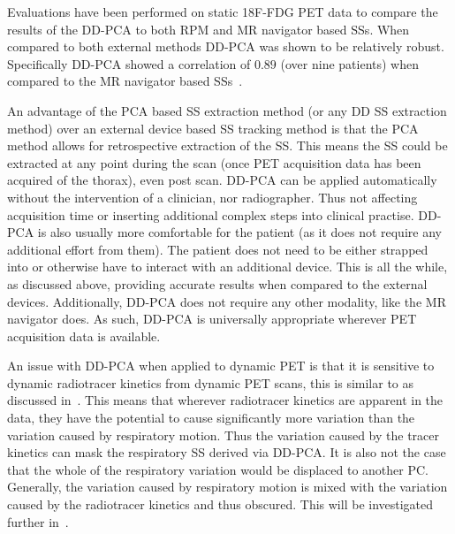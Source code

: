                 Evaluations have been performed on static \gls{18F-FDG} \gls{PET} data to compare the results of the \gls{DD-PCA} to both \gls{RPM} and \gls{MR} navigator based \glspl{SS}. When compared to both external methods \gls{DD-PCA} was shown to be relatively robust. Specifically \gls{DD-PCA} showed a correlation of $0.89$ (over nine patients) when compared to the \gls{MR} navigator based \glspl{SS}~\parencite{Thielemans2013ComparisonData, Manber2015PracticalPET/MR}.
                
                An advantage of the \gls{PCA} based \gls{SS} extraction method (or any \gls{DD} \gls{SS} extraction method) over an external device based \gls{SS} tracking method is that the \gls{PCA} method allows for retrospective extraction of the \gls{SS}. This means the \gls{SS} could be extracted at any point during the scan (once \gls{PET} acquisition data has been acquired of the thorax), even post scan. \gls{DD-PCA} can be applied automatically without the intervention of a clinician, nor radiographer. Thus not affecting acquisition time or inserting additional complex steps into clinical practise. \gls{DD-PCA} is also usually more comfortable for the patient (as it does not require any additional effort from them). The patient does not need to be either strapped into or otherwise have to interact with an additional device. This is all the while, as discussed above, providing accurate results when compared to the external devices. Additionally, \gls{DD-PCA} does not require any other modality, like the \gls{MR} navigator does. As such, \gls{DD-PCA} is universally appropriate wherever \gls{PET} acquisition data is available.%
                
                An issue with \gls{DD-PCA} when applied to dynamic \gls{PET} is that it is sensitive to dynamic radiotracer kinetics from dynamic \gls{PET} scans, this is similar to as discussed in~. This means that wherever radiotracer kinetics are apparent in the data, they have the potential to cause significantly more variation than the variation caused by respiratory motion. Thus the variation caused by the tracer kinetics can mask the respiratory \gls{SS} derived via \gls{DD-PCA}. It is also not the case that the whole of the respiratory variation would be displaced to another \gls{PC}. Generally, the variation caused by respiratory motion is mixed with the variation caused by the radiotracer kinetics and thus obscured. This will be investigated further in~.
        
